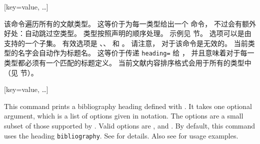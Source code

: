 \begin{ltxsyntax}
[key=value, \dots]


该命令遍历所有的文献类型。
这等价于为每一类型给出一个  命令，
不过会有额外好处：自动跳过空类型。
类型按照声明的顺序处理。
示例见  节。
选项可以是由  支持的一个子集。
有效选项是 、、 和 。
请注意， 对于该命令是无效的。
当前类型的名字会自动作为标题名。
这等价于传递 \texttt{heading=} 给 ，
并且意味着对于每一类型都必须有一个匹配的标题定义。
当前文献内容排序格式会用于所有的类型中（见  节）。

[key=value, \dots]


This command prints a bibliography heading defined with . It takes one optional argument, which is a list of options given in \keyval notation. The options are a small subset of those supported by . Valid options are ,  and . By default, this command uses the heading \texttt{bibliography}. See  for details. Also see  for usage examples.


\end{ltxsyntax}
